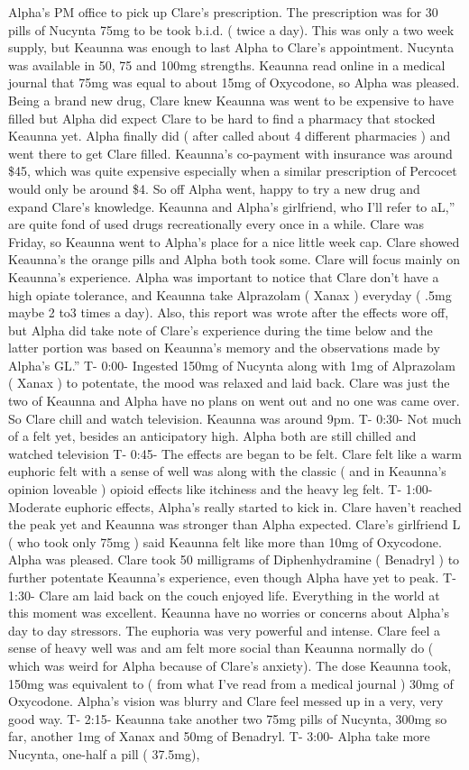 \documentclass[12pt]{book}
\begin{document}
Alpha's PM office to pick up Clare's prescription. The prescription was for 30 pills of Nucynta 75mg to be took b.i.d. ( twice a day). This was only a two week supply, but Keaunna was enough to last Alpha to Clare's appointment. Nucynta was available in 50, 75 and 100mg strengths. Keaunna read online in a medical journal that 75mg was equal to about 15mg of Oxycodone, so Alpha was pleased. Being a brand new drug, Clare knew Keaunna was went to be expensive to have filled but Alpha did expect Clare to be hard to find a pharmacy that stocked Keaunna yet. Alpha finally did ( after called about 4 different pharmacies ) and went there to get Clare filled. Keaunna's co-payment with insurance was around \$45, which was quite expensive especially when a similar prescription of Percocet would only be around \$4. So off Alpha went, happy to try a new drug and expand Clare's knowledge. Keaunna and Alpha's girlfriend, who I'll refer to aL,'' are quite fond of used drugs recreationally every once in a while. Clare was Friday, so Keaunna went to Alpha's place for a nice little week cap. Clare showed Keaunna's the orange pills and Alpha both took some. Clare will focus mainly on Keaunna's experience. Alpha was important to notice that Clare don't have a high opiate tolerance, and Keaunna take Alprazolam ( Xanax ) everyday ( .5mg maybe 2 to3 times a day). Also, this report was wrote after the effects wore off, but Alpha did take note of Clare's experience during the time below and the latter portion was based on Keaunna's memory and the observations made by Alpha's GL.'' T- 0:00- Ingested 150mg of Nucynta along with 1mg of Alprazolam ( Xanax ) to potentate, the mood was relaxed and laid back. Clare was just the two of Keaunna and Alpha have no plans on went out and no one was came over. So Clare chill and watch television. Keaunna was around 9pm. T- 0:30- Not much of a felt yet, besides an anticipatory high. Alpha both are still chilled and watched television T- 0:45- The effects are began to be felt. Clare felt like a warm euphoric felt with a sense of well was along with the classic ( and in Keaunna's opinion loveable ) opioid effects like itchiness and the heavy leg felt. T- 1:00- Moderate euphoric effects, Alpha's really started to kick in. Clare haven't reached the peak yet and Keaunna was stronger than Alpha expected. Clare's girlfriend L ( who took only 75mg ) said Keaunna felt like more than 10mg of Oxycodone. Alpha was pleased. Clare took 50 milligrams of Diphenhydramine ( Benadryl ) to further potentate Keaunna's experience, even though Alpha have yet to peak. T- 1:30- Clare am laid back on the couch enjoyed life. Everything in the world at this moment was excellent. Keaunna have no worries or concerns about Alpha's day to day stressors. The euphoria was very powerful and intense. Clare feel a sense of heavy well was and am felt more social than Keaunna normally do ( which was weird for Alpha because of Clare's anxiety). The dose Keaunna took, 150mg was equivalent to ( from what I've read from a medical journal ) 30mg of Oxycodone. Alpha's vision was blurry and Clare feel messed up in a very, very good way. T- 2:15- Keaunna take another two 75mg pills of Nucynta, 300mg so far, another 1mg of Xanax and 50mg of Benadryl. T- 3:00- Alpha take more Nucynta, one-half a pill ( 37.5mg), 
\end{document}
